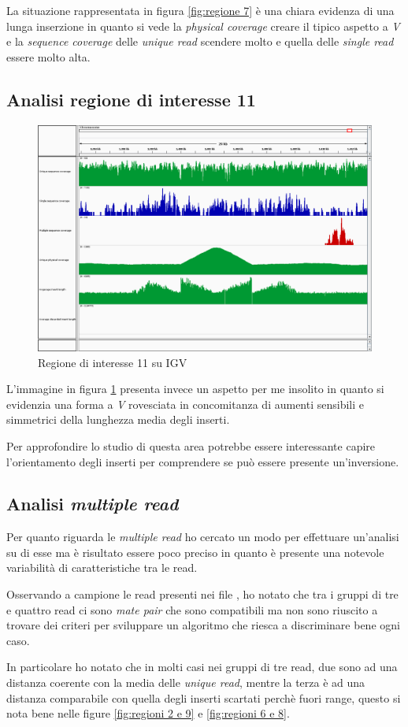 La situazione rappresentata in figura \ref{fig:regione 7} è una chiara evidenza di una lunga inserzione in quanto si vede la \emph{physical coverage} creare il tipico aspetto a \emph{V} e la \emph{sequence coverage} delle \emph{unique read} scendere molto e quella delle \emph{single read} essere molto alta.

\subsection{Analisi regione di interesse 11}
\begin{figure}[htbp]
	\centering
	\includegraphics[width=.45\textwidth]{immagini/igv_regione11.png}
	\caption{Regione di interesse 11 su IGV}
	\label{fig:regioni 11}
\end{figure}

L'immagine in figura \ref{fig:regioni 11} presenta invece un aspetto per me insolito in quanto si evidenzia una forma a \emph{V} rovesciata in concomitanza di aumenti sensibili e simmetrici della lunghezza media degli inserti.

Per approfondire lo studio di questa area potrebbe essere interessante capire l'orientamento degli inserti per comprendere se può essere presente un'inversione.

\subsection{Analisi \emph{multiple read}}
Per quanto riguarda le \emph{multiple read} ho cercato un modo per effettuare un'analisi su di esse ma è risultato essere poco preciso in quanto è presente una notevole variabilità di caratteristiche tra le read.

Osservando a campione le read presenti nei file , ho notato che tra i gruppi di tre e quattro read ci sono \emph{mate pair} che sono compatibili ma non sono riuscito a trovare dei criteri per sviluppare un algoritmo che riesca a discriminare bene ogni caso.

In particolare ho notato che in molti casi nei gruppi di tre read, due sono ad una distanza coerente con la media delle \emph{unique read}, mentre la terza è ad una distanza comparabile con quella degli inserti scartati perchè fuori range, questo si nota bene nelle figure \ref{fig:regioni 2 e 9} e \ref{fig:regioni 6 e 8}.

